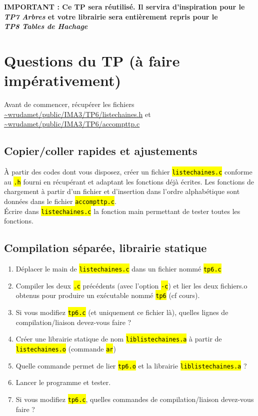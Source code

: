 \documentclass[final, a4paper, openbib, ]{article}
\let\OldTexttt\texttt
\renewcommand{\texttt}[1]{\OldTexttt{\hl{#1}}}
\begin{document}

\begin{alertinfo}{}
	\textbf{IMPORTANT : Ce TP sera réutilisé. Il servira d'inspiration pour le \textit{TP7 Arbres} et votre librairie sera entièrement repris pour le \\ \textit{TP8 Tables de Hachage}}
\end{alertinfo}

\section{Questions du TP \large (à faire impérativement)}
Avant de commencer, récupérer les fichiers \url{~wrudamet/public/IMA3/TP6/listechaines.h}  et \url{~wrudamet/public/IMA3/TP6/accompttp.c}

\subsection{Copier/coller rapides et ajustements}
À partir des codes dont vous disposez, créer un fichier \texttt{listechaines.c} conforme au \texttt{.h} fourni en récupérant et adaptant les fonctions déjà écrites. Les fonctions de chargement à partir d'un fichier et d'insertion dans l'ordre alphabétique sont données dans
le fichier \texttt{accompttp.c}.\\
Écrire dans \texttt{listechaines.c} la fonction main permettant de tester toutes les fonctions.

\subsection{Compilation séparée, librairie statique}
\begin{enumerate}
	\item Déplacer le main de \texttt{listechaines.c} dans un fichier nommé \texttt{tp6.c}
	\item Compiler les deux \texttt{.c} précédents (avec l'option \texttt{-c}) et lier les deux fichiers.o obtenus pour produire un exécutable nommé \texttt{tp6} (cf cours).
	\item Si vous modifiez \texttt{tp6.c} (et uniquement ce fichier là), quelles lignes de compilation/liaison devez-vous faire ?
	\item Créer une librairie statique de nom \texttt{liblistechaines.a} à partir de \texttt{listechaines.o} (commande \texttt{ar})
	\item Quelle commande permet de lier \texttt{tp6.o} et la librairie \texttt{liblistechaines.a} ?
	\item Lancer le programme et tester.
	\item Si vous modifiez \texttt{tp6.c}, quelles commandes de compilation/liaison devez-vous faire ?
\end{enumerate}
\end{document}
